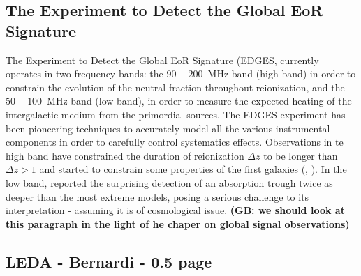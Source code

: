 \subsection{The Experiment to Detect the Global EoR Signature}
The Experiment to Detect the Global EoR Signature (EDGES, \cite{bowman08} currently operates in two frequency bands: the $90-200$~MHz band (high band) in order to constrain the evolution of the neutral fraction throughout reionization, and the $50-100$~MHz band (low band), in order to measure the expected heating of the intergalactic medium from the primordial sources. The EDGES experiment has been pioneering techniques to accurately model all the various instrumental components in order to carefully control systematics effects. Observations in te high band have constrained the duration of reionization $\Delta z$ to be longer than $\Delta z >  1$ and started to constrain some properties of the first galaxies (\cite{monsalve17}, \cite{monsalve18}). In the low band, \cite{bowman18} reported the surprising detection of an absorption trough twice as deeper than the most extreme models, posing a serious challenge to its interpretation - assuming it is of cosmological issue. {\bf (GB: we should look at this paragraph in the light of he chaper on global signal observations)}


\subsection{LEDA - Bernardi - 0.5 page}
\label{leda_global}




